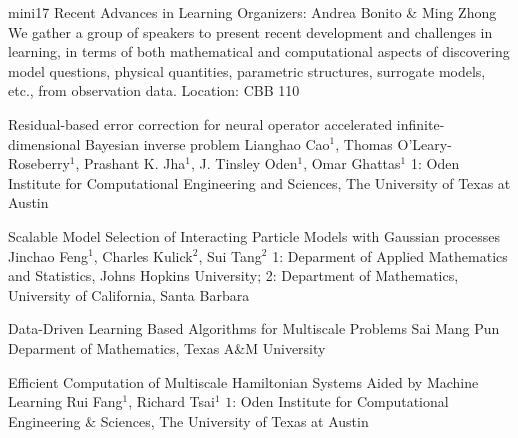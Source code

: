 \mini
{mini17}
{Recent Advances in Learning}
{Organizers: Andrea Bonito \& Ming Zhong}
{We gather a group of speakers to present recent development and challenges in learning, in terms of both mathematical and computational aspects of discovering model questions, physical quantities, parametric structures, surrogate models, etc., from observation data. }
{Location: CBB 110}

\begin{talks}
\item\talk
{Residual-based error correction for neural operator accelerated infinite-dimensional Bayesian inverse problem}
{Lianghao Cao$^1$, Thomas O'Leary-Roseberry$^1$, Prashant K. Jha$^1$, J. Tinsley Oden$^1$, Omar Ghattas$^1$}
{1: Oden Institute for Computational Engineering and Sciences, The University of Texas at Austin}
\item\talk
{Scalable Model Selection of Interacting Particle Models with Gaussian processes}
{Jinchao Feng$^1$, Charles Kulick$^2$, Sui Tang$^2$}
{1: Deparment of Applied Mathematics and Statistics, Johns Hopkins University; 2: Department of Mathematics, University of California, Santa Barbara}
\item\talk
{Data-Driven Learning Based Algorithms for Multiscale Problems}
{Sai Mang Pun}
{Deparment of Mathematics, Texas A\&M University}
\item\talk
{Efficient Computation of Multiscale Hamiltonian Systems Aided by Machine Learning}
{Rui Fang$^1$, Richard Tsai$^1$}
{$1$: Oden Institute for Computational Engineering $\&$ Sciences, The University of Texas at Austin}
\end{talks}
\room
